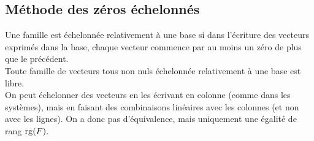   \subsection{Méthode des zéros échelonnés}\label{subsec:methode-des-zeros-echelonnes}
    
    Une famille est échelonnée relativement à une base si dans l'écriture des vecteurs exprimés dans la base, chaque vecteur commence par au moins un zéro de plus que le précédent.\\
    Toute famille de vecteurs tous non nuls échelonnée relativement à une base est libre.\\
    
    On peut échelonner des vecteurs en les écrivant en colonne (comme dans les systèmes), mais en faisant des combinaisons linéaires avec les colonnes (et non avec les lignes).
    On a donc pas d'équivalence, mais uniquement une égalité de rang $\operatorname{rg}(F)$.\\
    
  
    
    
  